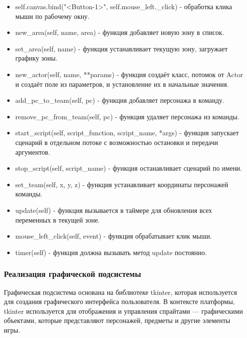 \begin{enumerate}
\begin{itemize}
		\item self.canvas.bind("<Button-1>", self.mouse\_left.\_click) - обработка клика мыши по рабочему окну.
		\item new\_area(self, name, area) - функция добавляет новую зону в список.
		\item set\_area(self, name) - функция устанавливает текущую зону, загружает графику зоны.
		\item new\_actor(self, name, **params) - функция создаёт класс, потомок от Actor и создаёт поле из параметров, и установление их в начальные значения.
		\item add\_pc\_to\_team(self, pc) - функция добавляет персонажа в команду.
		\item remove\_pc\_from\_team(self, pc) - функция удаляет персонажа из команды.
		\item start\_script(self, script\_function, script\_name, *args) - функция запускает сценарий в отдельном потоке с возможностью остановки и передачи аргументов.
		\item stop\_script(self, script\_name) - функция останавливает сценарий по имени.
		\item set\_team(self, x, y, z) - функция устанавливает координаты персонажей команды.
		\item update(self) - функция вызывается в таймере для обновления всех переменных в текущей зоне.
		\item mouse\_left\_click(self, event) - функция обрабатывает клик мыши.
		\item timer(self) - функция должна вызывать метод update постоянно.
	\end{itemize}
\end{enumerate}

\subsubsection{Реализация графической подсистемы}
Графическая подсистема основана на библиотеке tkinter, которая используется для создания графического интерфейса пользователя. В контексте платформы, tkinter используется для отображения и управления спрайтами — графическими объектами, которые представляют персонажей, предметы и другие элементы игры.
